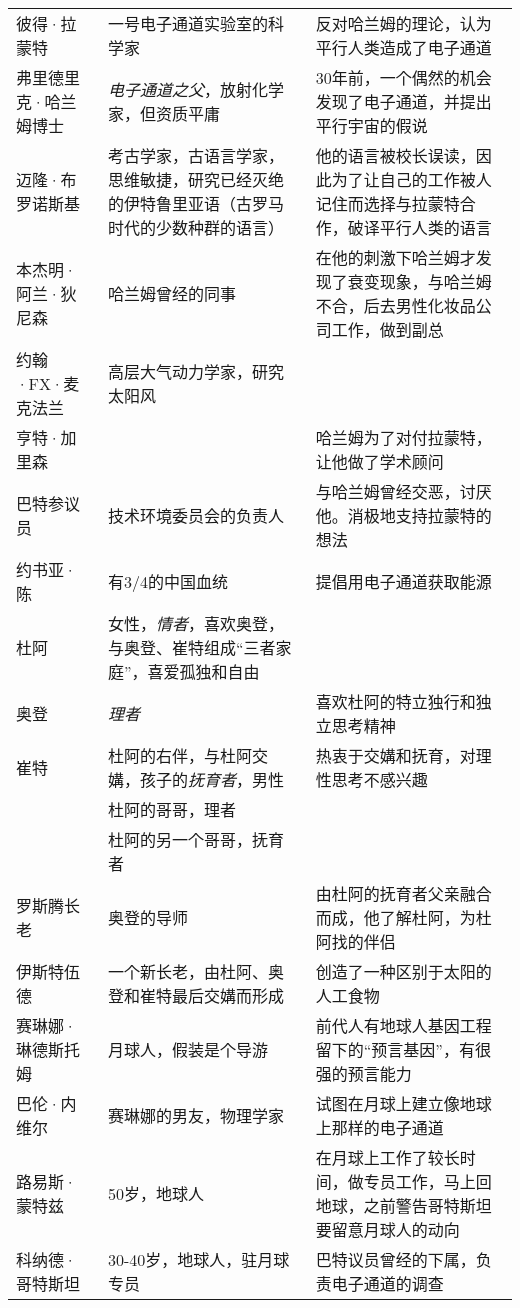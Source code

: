 \begin{table}[htpb]
\begin{tabular}{p{}|p{}|p{}}
彼得·拉蒙特 & 一号电子通道实验室的科学家 & 反对哈兰姆的理论，认为平行人类造成了电子通道\\
弗里德里克·哈兰姆博士 & \emph{电子通道之父}，放射化学家，但资质平庸 & 30年前，一个偶然的机会发现了电子通道，并提出平行宇宙的假说  \\
迈隆·布罗诺斯基 & 考古学家，古语言学家，思维敏捷，研究已经灭绝的伊特鲁里亚语（古罗马时代的少数种群的语言） & 他的语言被校长误读，因此为了让自己的工作被人记住而选择与拉蒙特合作，破译平行人类的语言 \\
本杰明·阿兰·狄尼森 & 哈兰姆曾经的同事 & 在他的刺激下哈兰姆才发现了衰变现象，与哈兰姆不合，后去男性化妆品公司工作，做到副总 \\
约翰·FX·麦克法兰 & 高层大气动力学家，研究太阳风 & \\
亨特·加里森 &  & 哈兰姆为了对付拉蒙特，让他做了学术顾问 \\
巴特参议员 & 技术环境委员会的负责人 & 与哈兰姆曾经交恶，讨厌他。消极地支持拉蒙特的想法 \\
约书亚·陈 & 有3/4的中国血统 & 提倡用电子通道获取能源 \\
杜阿 & 女性，\emph{情者}，喜欢奥登，与奥登、崔特组成“三者家庭”，喜爱孤独和自由 & \\
奥登 & \emph{理者} & 喜欢杜阿的特立独行和独立思考精神  \\
崔特 & 杜阿的右伴，与杜阿交媾，孩子的\emph{抚育者}，男性 & 热衷于交媾和抚育，对理性思考不感兴趣 \\
 & 杜阿的哥哥，理者 & \\ 
 &  杜阿的另一个哥哥，抚育者 & \\ 
 罗斯腾长老 & 奥登的导师 & 由杜阿的抚育者父亲融合而成，他了解杜阿，为杜阿找的伴侣 \\
伊斯特伍德 & 一个新长老，由杜阿、奥登和崔特最后交媾而形成 & 创造了一种区别于太阳的人工食物 \\
赛琳娜·琳德斯托姆 & 月球人，假装是个导游 & 前代人有地球人基因工程留下的“预言基因”，有很强的预言能力 \\
巴伦·内维尔 & 赛琳娜的男友，物理学家 & 试图在月球上建立像地球上那样的电子通道 \\
路易斯·蒙特兹 & 50岁，地球人 & 在月球上工作了较长时间，做专员工作，马上回地球，之前警告哥特斯坦要留意月球人的动向 \\
科纳德·哥特斯坦 & 30-40岁，地球人，驻月球专员 & 巴特议员曾经的下属，负责电子通道的调查
\end{tabular}
\end{table}


